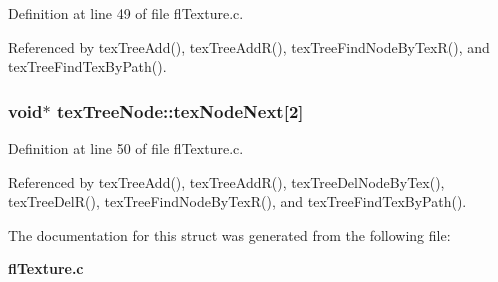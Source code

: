 Definition at line 49 of file fl\-Texture.c.

Referenced by tex\-Tree\-Add(), tex\-Tree\-Add\-R(), tex\-Tree\-Find\-Node\-By\-Tex\-R(), and tex\-Tree\-Find\-Tex\-By\-Path().
\subsubsection{\setlength{\rightskip}{0pt plus 5cm}void$\ast$ {\bf tex\-Tree\-Node::tex\-Node\-Next}[2]}\label{structtexTreeNode_b8500df2a4c07c455a1f05ddb83f63aa}




Definition at line 50 of file fl\-Texture.c.

Referenced by tex\-Tree\-Add(), tex\-Tree\-Add\-R(), tex\-Tree\-Del\-Node\-By\-Tex(), tex\-Tree\-Del\-R(), tex\-Tree\-Find\-Node\-By\-Tex\-R(), and tex\-Tree\-Find\-Tex\-By\-Path().

The documentation for this struct was generated from the following file:\begin{CompactItemize}
\item 
{\bf fl\-Texture.c}\end{CompactItemize}
